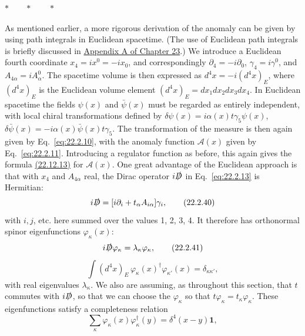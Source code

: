 \begin{center}
 $\ast\qquad\ast\qquad\ast$
\end{center}

As mentioned earlier, a more rigorous derivation of the anomaly can be
given by using path integrals in Euclidean spacetime. (The use of Euclidean
path integrals is briefly discussed in
\hyperref[app:23.A]{Appendix A of Chapter 23}.) We introduce a Euclidean
fourth coordinate $x_4=ix^0=-ix_0$, and correspondingly
$\partial_4=-i\partial_0$, $\gamma_4=i\gamma^0$, and
$A_{4\alpha}=iA_\alpha^0$. The spacetime volume is then expressed as
$d^4x=-i(d^4x)_E$, where $(d^4x)_E$ is the Euclidean volume element
$(d^4x)_E=dx_1dx_2dx_3dx_4$. In Euclidean spacetime the fields $\psi(x)$
and $\bar\psi(x)$ must be regarded as entirely independent, with local
chiral transformations defined by
$\delta\psi(x)=i\alpha(x)t\gamma_5\psi(x)$,
$\delta\bar\psi(x)=-i\alpha(x)\bar\psi(x)t\gamma_5$. The transformation of
the measure is then again given by Eq.~\eqref{eq:22.2.10}, with the anomaly
function $\mathcal A(x)$ given by Eq.~\eqref{eq:22.2.11}. Introducing a
regulator function as before, this again gives the formula
\hyperref[eq:22.2.13]{(22.12.13)} for $\mathcal A(x)$. One great advantage
of the Euclidean approach is that with $x_4$ and $A_{4\alpha}$ real, the
Dirac operator $i\sl{D}$ in Eq.~\eqref{eq:22.2.13} is Hermitian:
\begin{equation}
 i\sl{D}=[i\partial_i+t_\alpha A_{i\alpha}]\gamma_i,
 \tag{22.2.40}\label{eq:22.2.40}
\end{equation}
with $i,j$, etc. here summed over the values 1, 2, 3, 4. It therefore has
orthonormal spinor eigenfunctions $\varphi_\kappa(x)$:
\begin{equation}
 i\sl{D}\varphi_\kappa=\lambda_\kappa\varphi_\kappa,
 \tag{22.2.41}\label{eq:22.2.41}
\end{equation}
\begin{equation}
 \int(d^4x)_E\,\varphi_\kappa(x)^\dagger\varphi_{\kappa'}(x)
 =\delta_{\kappa\kappa'},
 \tag{22.2.42}\label{eq:22.2.42}
\end{equation}
with real eigenvalues $\lambda_\kappa$. We also are assuming, as throughout
this section, that $t$ commutes with $i\sl{D}$, so that we can choose the
$\varphi_\kappa$ so that
$t\varphi_\kappa=t_\kappa\varphi_\kappa$. These eigenfunctions satisfy a
completeness relation
\begin{equation}
 \sum_\kappa\varphi_\kappa(x)\varphi_\kappa^\dagger(y)
 =\delta^4(x-y)\mathbf{1},
 \tag{22.2.43}\label{eq:22.2.43}
\end{equation}
